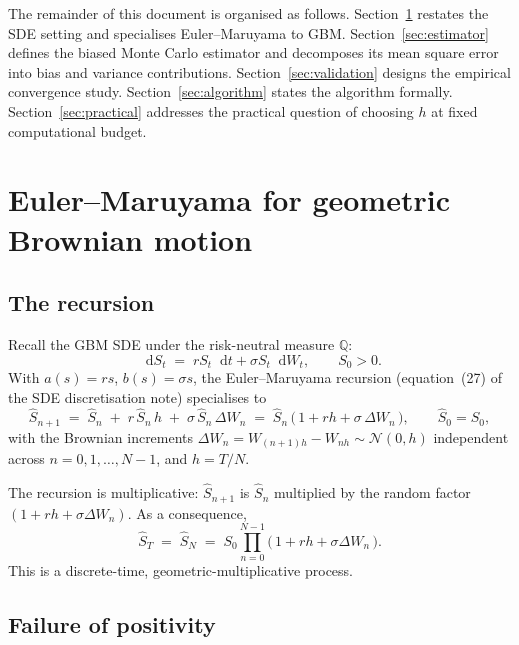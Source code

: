\documentclass[11pt,a4paper]{article}
\theoremstyle{plain}
\theoremstyle{definition}
\theoremstyle{remark}
\newcommand{\Q}{\mathbb{Q}}
\newcommand{\dd}{\mathop{}\!\mathrm{d}}
\begin{document}
The remainder of this document is organised as follows.
Section~\ref{sec:setting} restates the SDE setting and specialises
Euler--Maruyama to GBM. Section~\ref{sec:estimator} defines the
biased Monte Carlo estimator and decomposes its mean square error
into bias and variance contributions.
Section~\ref{sec:validation} designs the empirical convergence study.
Section~\ref{sec:algorithm} states the algorithm formally.
Section~\ref{sec:practical} addresses the practical question of
choosing $h$ at fixed computational budget.

\section{Euler--Maruyama for geometric Brownian motion}
\label{sec:setting}

\subsection{The recursion}

Recall the GBM SDE under the risk-neutral measure $\Q$:
\begin{equation}
\label{eq:sde-gbm}
\dd S_t \;=\; r S_t \dd t + \sigma S_t \dd W_t,
\qquad S_0 > 0.
\end{equation}
With $a(s) = r s$, $b(s) = \sigma s$, the Euler--Maruyama
recursion (equation~(27) of the SDE discretisation note) specialises to
\begin{equation}
\label{eq:euler-gbm}
\hat S_{n+1} \;=\; \hat S_n \;+\; r\, \hat S_n\, h
\;+\; \sigma\, \hat S_n\, \Delta W_n
\;=\; \hat S_n\,\big(\, 1 + r h + \sigma\, \Delta W_n \,\big),
\qquad \hat S_0 = S_0,
\end{equation}
with the Brownian increments $\Delta W_n =
W_{(n+1) h} - W_{n h} \sim \mathcal{N}(0, h)$ independent across
$n = 0, 1, \ldots, N - 1$, and $h = T / N$.

The recursion is multiplicative: $\hat S_{n+1}$ is $\hat S_n$
multiplied by the random factor $(1 + r h + \sigma \Delta W_n)$. As a
consequence,
\begin{equation}
\hat S_T \;=\; \hat S_N \;=\;
S_0 \prod_{n=0}^{N-1} \big(\, 1 + r h + \sigma \Delta W_n \,\big).
\end{equation}
This is a discrete-time, geometric-multiplicative process.

\subsection{Failure of positivity}
\end{document}
